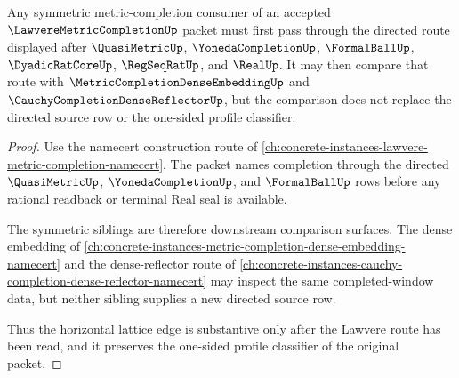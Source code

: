 \begin{theorem}\label{thm:lawvere-metric-completion-sibling-lattice-route}
Any symmetric metric-completion consumer of an accepted $\LawvereMetricCompletionUp$ packet must first pass through the directed route displayed after $\QuasiMetricUp$, $\YonedaCompletionUp$, $\FormalBallUp$, $\DyadicRatCoreUp$, $\RegSeqRatUp$, and $\RealUp$. It may then compare that route with $\MetricCompletionDenseEmbeddingUp$ and $\CauchyCompletionDenseReflectorUp$, but the comparison does not replace the directed source row or the one-sided profile classifier.
\end{theorem}
\begin{proof}
Use the namecert construction route of \autoref{ch:concrete-instances-lawvere-metric-completion-namecert}. The packet names completion through the directed $\QuasiMetricUp$, $\YonedaCompletionUp$, and $\FormalBallUp$ rows before any rational readback or terminal Real seal is available.

The symmetric siblings are therefore downstream comparison surfaces. The dense embedding of \autoref{ch:concrete-instances-metric-completion-dense-embedding-namecert} and the dense-reflector route of \autoref{ch:concrete-instances-cauchy-completion-dense-reflector-namecert} may inspect the same completed-window data, but neither sibling supplies a new directed source row.

Thus the horizontal lattice edge is substantive only after the Lawvere route has been read, and it preserves the one-sided profile classifier of the original packet.
\end{proof}
